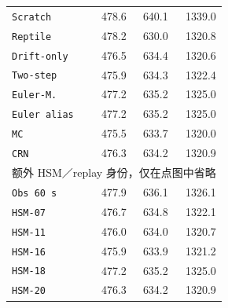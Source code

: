 \begin{longtable}{lrrr}
\texttt{Scratch} & 478.6 & 640.1 & 1339.0\\
\texttt{Reptile} & 478.2 & 630.0 & 1320.8\\
\texttt{Drift-only} & 476.5 & 634.4 & 1320.6\\
\texttt{Two-step} & 475.9 & 634.3 & 1322.4\\
\texttt{Euler-M.} & 477.2 & 635.2 & 1325.0\\
\texttt{Euler alias} & 477.2 & 635.2 & 1325.0\\
\texttt{MC} & 475.5 & 633.7 & 1320.0\\
\texttt{CRN} & 476.3 & 634.2 & 1320.9\\
\midrule
\multicolumn{4}{l}{额外 HSM／replay 身份，仅在点图中省略}\\
\texttt{Obs 60 s} & 477.9 & 636.1 & 1326.1\\
\texttt{HSM-07} & 476.7 & 634.8 & 1322.1\\
\texttt{HSM-11} & 476.0 & 634.0 & 1320.7\\
\texttt{HSM-16} & 475.9 & 633.9 & 1321.2\\
\texttt{HSM-18} & 477.2 & 635.2 & 1325.0\\
\texttt{HSM-20} & 476.3 & 634.2 & 1320.9\\
\end{longtable}
\endgroup
